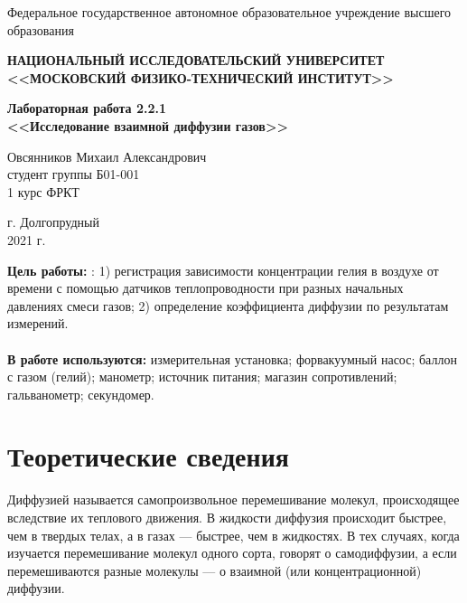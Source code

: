 \documentclass[a4paper,12pt]{article} %
\begin{document}
	\begin{center}
		
		\normalsize{Федеральное государственное автономное образовательное учреждение высшего образования}
		
		\textbf{НАЦИОНАЛЬНЫЙ ИССЛЕДОВАТЕЛЬСКИЙ УНИВЕРСИТЕТ \\ <<МОСКОВСКИЙ ФИЗИКО-ТЕХНИЧЕСКИЙ ИНСТИТУТ>>}
		\vspace{13ex}
		
		\textbf{Лабораторная работа 2.2.1 \\ <<Исследование взаимной диффузии газов>> }
		\vspace{40ex}
		
		\normalsize{Овсянников Михаил Александрович \\ студент группы Б01-001\\ 1 курс ФРКТ\\}
	\end{center}
	
	\vfill 
	
	\begin{center}
		г. Долгопрудный\\ 
		2021 г.
	\end{center}
	
	\thispagestyle{empty} %
	
	\newpage
	
	\textbf{Цель работы:} : 1) регистрация зависимости концентрации гелия в воздухе от времени с помощью датчиков теплопроводности при разных начальных давлениях смеси газов; 2) определение коэффициента диффузии по результатам измерений.
	\\
	\\
\indent	\textbf{В работе используются:}  измерительная установка; форвакуумный насос; баллон с газом (гелий); манометр; источник питания; магазин сопротивлений; гальванометр; секундомер.

\section*{Теоретические сведения}
\indent Диффузией называется самопроизвольное перемешивание молекул, происходящее вследствие их теплового движения. В жидкости диффузия происходит быстрее, чем в твердых телах, а в газах — быстрее, чем в жидкостях. В тех случаях, когда изучается перемешивание молекул одного сорта, говорят о самодиффузии, а если перемешиваются разные молекулы — о взаимной (или концентрационной) диффузии.
	
\end{document}
